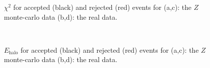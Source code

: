 \documentclass[twoside,        %
               BCOR12mm,       %
               ngerman,english, %
               fleqn,headsepline=false,footsepline=false
              ]{Vorlage/MFPREPORT}
\begin{document}
\begin{appendices}
\begin{figure}
\begin{center}
{        }
    \end{center}
    \caption{
        $\chi^2$ for accepted (black) and rejected (red) events
            for (a,c): the $Z$ monte-carlo data (b,d): the real data.}{
     }
   \label{fig:chi}
\end{figure}
\begin{figure}
     \begin{center}
        \\ %
    \end{center}
    \caption{
    $E_{\text{halo}}$ for accepted (black) and rejected (red) events
            for (a,c): the $Z$ monte-carlo data (b,d): the real data.}{
     }
  \label{fig:ehalo}


\end{figure}
\end{appendices}
\end{document}
